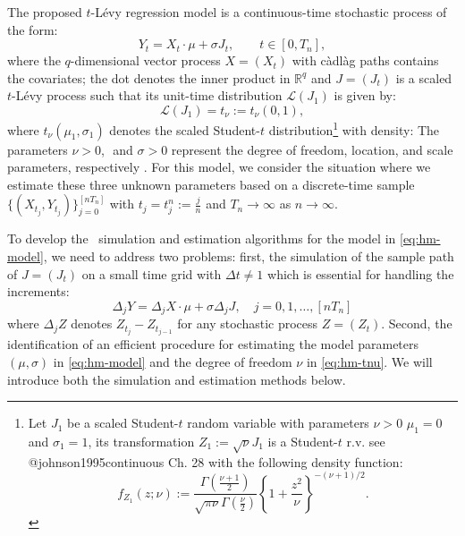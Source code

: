 The proposed \(t\)-Lévy regression model is a continuous-time stochastic process of the form:
\begin{equation}
Y_t = X_t \cdot \mu + \sigma J_t, \qquad t\in[0,T_n],
\label{eq:hm-model}
\end{equation}
where the \(q\)-dimensional vector process \(X=(X_t)\) with càdlàg paths contains the covariates; the dot denotes the inner product in \(\mathbb{R}^q\) and \(J=(J_t)\) is a scaled \(t\)-Lévy process such that its unit-time distribution \(\mathcal{L}(J_1)\) is given by:
\begin{equation}
\mathcal{L}(J_1) = t_\nu:=t_\nu(0,1),
\label{eq:hm-tnu}
\end{equation}
where \(t_\nu(\mu_1,\sigma_1)\) denotes the scaled Student-\(t\) distribution\footnote{ Let $J_1$ be a scaled Student-$t$ random variable with parameters $\nu>0$ $\mu_1=0$ and $\sigma_1=1$, its transformation $Z_1:=\sqrt{\nu} J_1$ is a Student-$t$ r.v. see @johnson1995continuous Ch. 28 with the following density function:
\begin{equation*}
f_{Z_1}(z;\nu) := \frac{\Gamma(\frac{\nu+1}{2})}{\sqrt{\pi \nu}\Gamma(\frac{\nu}{2})}
\left\{1+\frac{z^2}{\nu}\right\}^{-(\nu+1)/2}.
\end{equation*}
} with density:
The parameters \(\nu>0\), \(\) and \(\sigma>0\) represent the degree of freedom, location, and scale parameters, respectively \citep[see][ for more details on a \(t\)-Lévy process]{HeyLeo05, Cuf07}.
For this model, we consider the situation where we estimate these three unknown parameters based on a discrete-time sample \(\{(X_{t_j},Y_{t_j})\}_{j=0}^{[nT_n]}\) with \(t_j=t_j^n:=\frac{j}{n}\) and \(T_n\to \infty\) as \(n\to\infty\).

To develop the  ~simulation and estimation algorithms for the model in \eqref{eq:hm-model}, we need to address two problems: first, the simulation of the sample path of \(J=(J_t)\) on a small time grid with \(\Delta t \neq1\) which is essential for handling the increments:
\[\Delta_j Y = \Delta_j X \cdot \mu +\sigma\Delta_j J, \quad j=0,1,\dots, [nT_n]\]
where \(\Delta_j Z\) denotes \(Z_{t_j}-Z_{t_{j-1}}\) for any stochastic process \(Z=(Z_t)\).
Second, the identification of an efficient procedure for estimating the model parameters \(\left(\mu, \sigma\right)\) in \eqref{eq:hm-model} and the degree of freedom \(\nu\) in \eqref{eq:hm-tnu}.
We will introduce both the simulation and estimation methods below.


